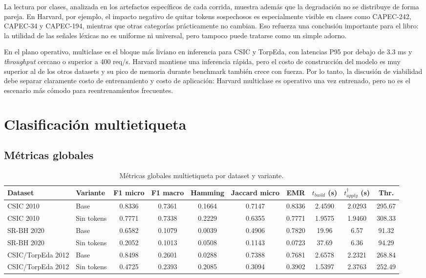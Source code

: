 \documentclass[12pt,oneside]{report}
\begin{document}
La lectura por clases, analizada en los artefactos específicos de cada corrida, muestra además que la degradación no se distribuye de forma pareja. En Harvard, por ejemplo, el impacto negativo de quitar tokens sospechosos es especialmente visible en clases como CAPEC-242, CAPEC-34 y CAPEC-194, mientras que otras categorías prácticamente no cambian. Eso refuerza una conclusión importante para el libro: la utilidad de las señales léxicas no es uniforme ni universal, pero tampoco puede tratarse como un simple adorno.\

En el plano operativo, multiclase es el bloque más liviano en inferencia para CSIC y TorpEda, con latencias P95 por debajo de 3.3 ms y \textit{throughput} cercano o superior a 400 req/s. Harvard mantiene una inferencia rápida, pero el costo de construcción del modelo es muy superior al de los otros datasets y su pico de memoria durante benchmark también crece con fuerza. Por lo tanto, la discusión de viabilidad debe separar claramente costo de entrenamiento y costo de aplicación: Harvard multiclase es operativo una vez entrenado, pero no es el escenario más cómodo para reentrenamientos frecuentes.

\section{Clasificación multietiqueta}
\subsection{Métricas globales}
\begin{table}[H]
\centering
\caption{Métricas globales multietiqueta por dataset y variante.}
\label{tab:res-ml-eff}
\scriptsize
\renewcommand{\arraystretch}{1.12}
\begin{adjustbox}{max width=\textwidth}
\begin{tabular}{llcccccccc}
\toprule
\textbf{Dataset} & \textbf{Variante} & \textbf{F1 micro} & \textbf{F1 macro} & \textbf{Hamming} & \textbf{Jaccard micro} & \textbf{EMR} & $t_{build}$ (s) & $t_{apply}^{\dagger}$ (s) & \textbf{Thr.} \\
\midrule
CSIC 2010 & Base & 0.8336 & 0.7361 & 0.1664 & 0.7147 & 0.8336 & 2.4590 & 2.0293 & 295.67 \\CSIC 2010 & Sin tokens & 0.7771 & 0.7338 & 0.2229 & 0.6355 & 0.7771 & 1.9575 & 1.9460 & 308.33 \\SR-BH 2020 & Base & 0.6582 & 0.1079 & 0.0039 & 0.4906 & 0.7820 & 19.96 & 6.57 & 91.32 \\SR-BH 2020 & Sin tokens & 0.2052 & 0.1013 & 0.0508 & 0.1143 & 0.0723 & 37.69 & 6.36 & 94.29 \\CSIC/TorpEda 2012 & Base & 0.8498 & 0.2601 & 0.0288 & 0.7388 & 0.7681 & 2.6578 & 2.2321 & 268.84 \\CSIC/TorpEda 2012 & Sin tokens & 0.4725 & 0.2393 & 0.2085 & 0.3094 & 0.3902 & 1.5397 & 2.3763 & 252.49 \\\bottomrule
\end{tabular}
\end{adjustbox}
\end{table}
\end{document}
